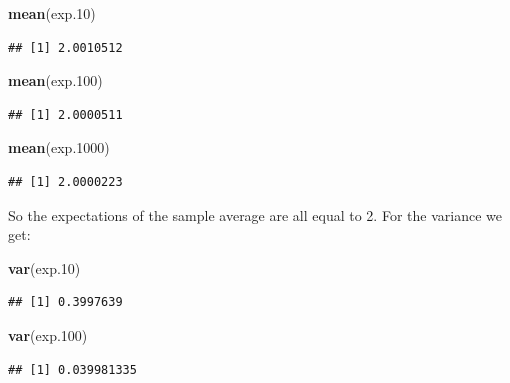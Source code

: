 \documentclass[]{krantz}
\makeatletter
\newenvironment{Shaded}{\begin{snugshade}}{\end{snugshade}}
\newcommand{\KeywordTok}[1]{\textcolor[rgb]{0.13,0.29,0.53}{\textbf{#1}}}
\newcommand{\DecValTok}[1]{\textcolor[rgb]{0.00,0.00,0.81}{#1}}
\newcommand{\NormalTok}[1]{#1}
\newenvironment{kframe}{%
\medskip{}
\setlength{\fboxsep}{.8em}
 \def\at@end@of@kframe{}%
 \ifinner\ifhmode%
  \def\at@end@of@kframe{\end{minipage}}%
  \begin{minipage}{\columnwidth}%
 \fi\fi%
 \def\FrameCommand##1{\hskip\@totalleftmargin \hskip-\fboxsep
 \colorbox{shadecolor}{##1}\hskip-\fboxsep
     \hskip-\linewidth \hskip-\@totalleftmargin \hskip\columnwidth}%
 \MakeFramed {\advance\hsize-\width
   \@totalleftmargin\z@ \linewidth\hsize
   \@setminipage}}%
 {\par\unskip\endMakeFramed%
 \at@end@of@kframe}
\renewenvironment{Shaded}{\begin{kframe}}{\end{kframe}}
\theoremstyle{definition}
\theoremstyle{definition}
\theoremstyle{definition}
\theoremstyle{remark}
\makeatother
\begin{document}
\begin{Shaded}
\begin{Highlighting}[]
\KeywordTok{mean}\NormalTok{(exp.}\DecValTok{10}\NormalTok{)}
\end{Highlighting}
\end{Shaded}

\begin{verbatim}
## [1] 2.0010512
\end{verbatim}

\begin{Shaded}
\begin{Highlighting}[]
\KeywordTok{mean}\NormalTok{(exp.}\DecValTok{100}\NormalTok{)}
\end{Highlighting}
\end{Shaded}

\begin{verbatim}
## [1] 2.0000511
\end{verbatim}

\begin{Shaded}
\begin{Highlighting}[]
\KeywordTok{mean}\NormalTok{(exp.}\DecValTok{1000}\NormalTok{)}
\end{Highlighting}
\end{Shaded}

\begin{verbatim}
## [1] 2.0000223
\end{verbatim}

So the expectations of the sample average are all equal to 2. For the
variance we get:

\begin{Shaded}
\begin{Highlighting}[]
\KeywordTok{var}\NormalTok{(exp.}\DecValTok{10}\NormalTok{)}
\end{Highlighting}
\end{Shaded}

\begin{verbatim}
## [1] 0.3997639
\end{verbatim}

\begin{Shaded}
\begin{Highlighting}[]
\KeywordTok{var}\NormalTok{(exp.}\DecValTok{100}\NormalTok{)}
\end{Highlighting}
\end{Shaded}

\begin{verbatim}
## [1] 0.039981335
\end{verbatim}
\end{document}
